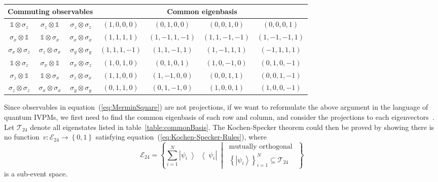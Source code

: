 \documentclass[english,reprint, aps, prl,superscriptaddress, showpacs,
showkeys]{revtex4-1}
\theoremstyle{plain}
\theoremstyle{definition}
\newcommand{\events}{\ensuremath{\mathcal{E}}}
\newcommand{\ket}[1]{{\left\vert{#1}\right\rangle}}
\newcommand{\op}[2]{\ensuremath{\left\vert{#1}\middle\rangle\middle\langle{#2}\right\vert}}
\newcommand{\proj}[1]{\op{#1}{#1}}
\newcommand{\set}[2]{\ensuremath{\left\{ {#1}~\middle|~{#2}\right\} }}
\begin{document}
\begin{table*}
\caption{\label{table:commonBasis}In each row, three observables are listed
in the left column commutes, and their common eigenbasis is listed
in the right column. In order to unify and simplify the notation,
we do not normalize eigenstates, and represent the state~$\alpha_{0}\ket{0}+\alpha_{1}\ket{1}+\alpha_{2}\ket{2}+\alpha_{3}\ket{3}$
as $\left(\alpha_{0},\alpha_{1},\alpha_{2},\alpha_{3}\right)$.}

\begin{ruledtabular}
\begin{tabular}{ccc|cccc}
\multicolumn{3}{c}{Commuting observables} & \multicolumn{4}{c}{Common eigenbasis}\tabularnewline
\hline 
$\mathbb{1}\otimes\sigma_{z}$  & $\sigma_{z}\otimes\mathbb{1}$  & $\sigma_{z}\otimes\sigma_{z}$  & $(1,0,0,0)$  & $(0,1,0,0)$  & $(0,0,1,0)$  & $(0,0,0,1)$ \tabularnewline
$\sigma_{x}\otimes\mathbb{1}$  & $\mathbb{1}\otimes\sigma_{x}$  & $\sigma_{x}\otimes\sigma_{x}$  & $(1,1,1,1)$  & $(1,-1,1,-1)$  & $(1,1,-1,-1)$  & $(1,-1,-1,1)$ \tabularnewline
$\sigma_{x}\otimes\sigma_{z}$  & $\sigma_{z}\otimes\sigma_{x}$  & $\sigma_{y}\otimes\sigma_{y}$  & $(1,1,1,-1)$  & $(1,1,-1,1)$  & $(1,-1,1,1)$  & $(-1,1,1,1)$ \tabularnewline
$\mathbb{1}\otimes\sigma_{z}$  & $\sigma_{x}\otimes\mathbb{1}$  & $\sigma_{x}\otimes\sigma_{z}$  & $(1,0,1,0)$  & $(0,1,0,1)$  & $(1,0,-1,0)$  & $(0,1,0,-1)$ \tabularnewline
$\sigma_{z}\otimes\mathbb{1}$  & $\mathbb{1}\otimes\sigma_{x}$  & $\sigma_{z}\otimes\sigma_{x}$  & $(1,1,0,0)$  & $(1,-1,0,0)$  & $(0,0,1,1)$  & $(0,0,1,-1)$ \tabularnewline
$\sigma_{z}\otimes\sigma_{z}$  & $\sigma_{x}\otimes\sigma_{x}$  & $\sigma_{y}\otimes\sigma_{y}$  & $(0,1,1,0)$  & $(0,1,-1,0)$  & $(1,0,0,1)$  & $(1,0,0,-1)$ \tabularnewline
\end{tabular}
\end{ruledtabular}

\end{table*}

Since observables in equation~(\ref{eq:MerminSquare}) are not projections,
if we want to reformulate the above argument in the language of quantum
IVPMs, we first need to find the common eigenbasis of each row and
column, and consider the projections to each eigenvectors~\citep{Kernaghan1994,peres1995quantum}.
Let $\mathcal{T}_{24}$ denote all eigenstates listed in table~\ref{table:commonBasis}.
The Kochen-Specker theorem could then be proved by showing there is
no function~$v:\events_{24}\rightarrow\left\{ 0,1\right\} $ satisfying
equation~(\ref{eq:Kochen-Specker-Rules}), where 
\begin{equation}
\events_{24}=\set{\sum_{i=1}^{N}\proj{\psi_{i}}}{\begin{gathered}\textrm{mutually orthogonal }\\
\left\{ \ket{\psi_{i}}\right\} _{i=1}^{N}\subseteq\mathcal{T}_{24}
\end{gathered}
}
\end{equation}
is a sub-event space.
\end{document}
